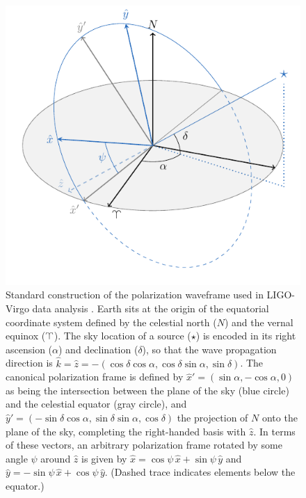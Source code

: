 \documentclass[aps,prd,twocolumn,superscriptaddress,preprintnumbers,floatfix,nofootinbib]{revtex4-2}
\begin{document}
\begin{figure}
\includegraphics[width=0.9\columnwidth]{diagram_waveframe.pdf}
\caption{Standard construction of the polarization waveframe used in LIGO-Virgo data analysis \cite{LALSuite:wave}. Earth sits at the origin of the equatorial coordinate system defined by the celestial north ($N$) and the vernal equinox ($\vernal$). The sky location of a source ($\star$) is encoded in its right ascension ($\alpha$) and declination ($\delta$), so that the wave propagation direction is $\hat{k}=\hat{z}=-(\cos\delta \cos\alpha, \cos\delta\sin\alpha, \sin\delta)$. The canonical polarization frame is defined by $\hat{x}'=(\sin\alpha, -\cos\alpha,0)$ as being the intersection between the plane of the sky (blue circle) and the celestial equator (gray circle), and $\hat{y}'=(-\sin\delta \cos\alpha, \sin\delta\sin\alpha, \cos\delta)$ the projection of $N$ onto the plane of the sky, completing the right-handed basis with $\hat{z}$.
In terms of these vectors, an arbitrary polarization frame rotated by some angle $\psi$ around $\hat{z}$ is given by $\hat{x}=\cos\psi\,\hat{x} + \sin\psi\,\hat{y}$ and $\hat{y}=-\sin\psi\,\hat{x} + \cos\psi\,\hat{y}$. (Dashed trace indicates elements below the equator.)}
\label{fig:diagram_waveframe}
\end{figure}
\end{document}
